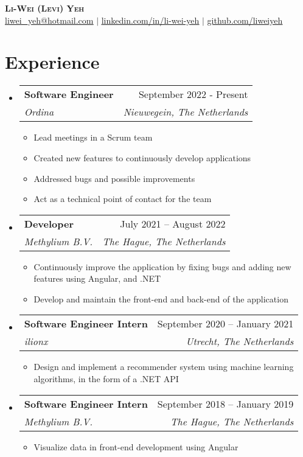 \documentclass[letterpaper,11pt]{article}
\makeatletter
\newcommand{\resumeItem}[1]{
	\item\small{
		{#1 \vspace{-2pt}}
	}
}
\newcommand{\resumeSubheading}[4]{
	\vspace{4pt}\item
	\begin{tabular*}{0.97\textwidth}[t]{l@{\extracolsep{\fill}}r}
		\textbf{#1} & #2 \\
		\textit{\small#3} & \textit{\small #4} \\
	\end{tabular*}\vspace{-7pt}
}
\newcommand{\resumeSubHeadingListStart}{\begin{itemize}[leftmargin=0.15in, label={}]}
\newcommand{\resumeSubHeadingListEnd}{\end{itemize}}
\newcommand{\resumeItemListStart}{\begin{itemize}}
\newcommand{\resumeItemListEnd}{\end{itemize}\vspace{-5pt}}
\makeatother
\begin{document}
	
	\begin{center}
		\textbf{\Huge \scshape Li-Wei (Levi) Yeh} \\ \vspace{1pt}
		\small \href{mailto:liwei_yeh@hotmail.com}{\underline{liwei\_yeh@hotmail.com}} $|$ 
		\href{https://www.linkedin.com/in/li-wei-yeh/}{\underline{linkedin.com/in/li-wei-yeh}} $|$
		\href{https://github.com/LiWeiYeh/}{\underline{github.com/liweiyeh}}
	\end{center}
	
	
	
	\section{Experience}
	\resumeSubHeadingListStart
	
	\resumeSubheading
	{Software Engineer}{September 2022 - Present}
	{Ordina}{Nieuwegein, The Netherlands}
	\resumeItemListStart
	\resumeItem{Lead meetings in a Scrum team}\\
	\resumeItem{Created new features to continuously develop applications}\\
	\resumeItem{Addressed bugs and possible improvements}\\
	\resumeItem{Act as a technical point of contact for the team}\\
	\resumeItemListEnd
	
	\resumeSubheading
	{Developer}{July 2021 – August 2022}
	{Methylium B.V.}{The Hague, The Netherlands}
	\resumeItemListStart
	\resumeItem{Continuously improve the application by fixing bugs and adding new\\ 
		features using Angular, and .NET}
	\resumeItem{Develop and maintain the front-end and back-end of the application}
	\resumeItemListEnd
	
	\resumeSubheading
	{Software Engineer Intern}{September 2020 -- January 2021}
	{ilionx}{Utrecht, The Netherlands}
	\resumeItemListStart
	\resumeItem{Design and implement a recommender system using machine learning\\
		algorithms, in the form of a .NET API}
	\resumeItemListEnd
	
	\resumeSubheading
	{Software Engineer Intern}{September 2018 -- January 2019}
	{Methylium B.V.}{The Hague, The Netherlands}
	\resumeItemListStart
	\resumeItem{Visualize data in front-end development using Angular}
	\resumeItemListEnd
	
	\resumeSubHeadingListEnd
	
\end{document}
